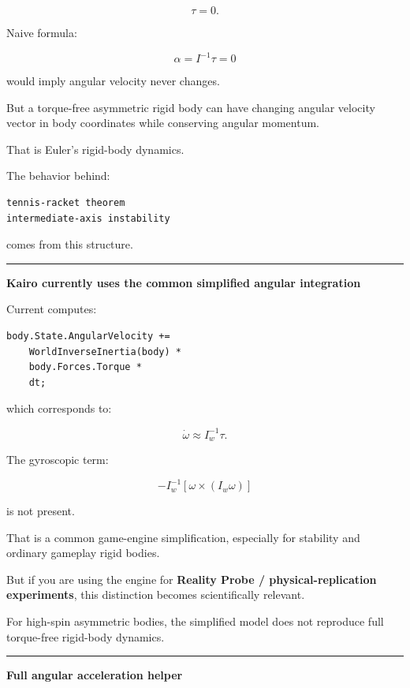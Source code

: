 \[
\tau=0.
\]

Naive formula:

\[
\alpha=I^{-1}\tau=0
\]

would imply angular velocity never changes.

But a torque-free asymmetric rigid body can have changing angular velocity vector in body coordinates while conserving angular momentum.

That is Euler's rigid-body dynamics.

The behavior behind:

\begin{verbatim}
tennis-racket theorem
intermediate-axis instability
\end{verbatim}

comes from this structure.

\begin{center}\rule{0.5\linewidth}{0.5pt}\end{center}

\textbf{Kairo currently uses the common simplified angular integration}

Current  computes:

\begin{verbatim}
body.State.AngularVelocity +=
    WorldInverseInertia(body) *
    body.Forces.Torque *
    dt;
\end{verbatim}

which corresponds to:

\[
\dot\omega
\approx
I_w^{-1}\tau.
\]

The gyroscopic term:

\[
-I_w^{-1}
[
\omega\times(I_w\omega)
]
\]

is not present.

That is a common game-engine simplification, especially for stability and ordinary gameplay rigid bodies.

But if you are using the engine for \textbf{Reality Probe / physical-replication experiments}, this distinction becomes scientifically relevant.

For high-spin asymmetric bodies, the simplified model does not reproduce full torque-free rigid-body dynamics.

\begin{center}\rule{0.5\linewidth}{0.5pt}\end{center}

\textbf{Full angular acceleration helper}

